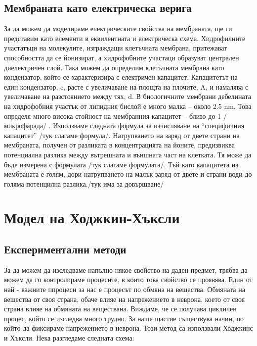\documentclass{article}
\begin{document}
\subsection{Мембраната като електрическа верига}

За да можем да моделираме електрическите свойства на мембраната, ще ги представим като елементи в еквилентната и електрическа схема. Хидрофилните участатъци на молекулите, изграждащи клетъчната мембрана, притежават способността да се йонизират, а хидрофобните участаци образуват централен диелектричен слой. Така можем да определим клетъчната мембрана като кондензатор, който се характеризира с електричен капацитет. Капацитетът на един кондензатор, c, расте с увеличаване на площта на плочите, A, и намалява с увеличаване на разстоянието между тях, d. В биологичните мембрани дебелината на хидрофобния участък от липидния бислой е много малка – около 2.5 nm. Това определя много висока стойност на мембранния капацитет – близо до 1 /микрофарада/ .  Използваме следната формула за изчисляване на “специфичния капацитет” /тук слагаме формула/. Натрупването на заряд от двете страни на мембраната, получен от разликата в концентрацията на йоните, предизвиква потенциална разлика между вътрешната и външната част на клетката. Тя може да бъде измерена с формулата /тук слагаме формулата/. Тъй като капацитета на мембраната е голям, дори натрупването на малък заряд от двете и страни води до голяма потенцилна разлика./тук има за довършване/ 

\section{Модел на Ходжкин-Хъксли}
    \subsection[Експериментални методи]{Експериментални методи}
        За да можем да изследваме напълно някое свойство на даден предмет, трябва да можем да го контролираме процесите, в които това свойство
        се проявява.  Един от най - важните ппроцеси за нас е процесът по обмяна на вещества.  Обмяната на вещества от своя страна, обаче влияе
        на напрежението в неврона, което от своя страна влияе на обмяната на веществана. Виждаме, че се получава цикличен процес, който се
        изследва много трудно. За наше щастие съществува начин, по който да фиксираме напрежението в неврона. Този метод са използвали Ходжкинс
        и Хъксли. Нека разгледаме следната схема:
\end{document}
